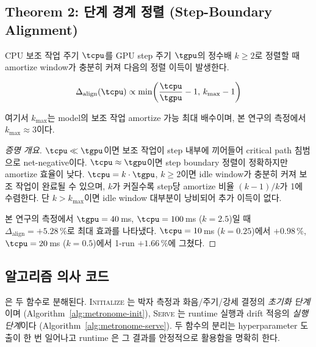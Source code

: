 \subsection{Theorem 2: 단계 경계 정렬 (Step-Boundary Alignment)}
\label{subsec:theorem2}

\begin{theorem}
\label{thm:alignment}
CPU 보조 작업 주기 $\tcpu$를 GPU step 주기 $\tgpu$의 정수배 $k \geq 2$로 정렬할 때 amortize window가 충분히 커져 다음의 정렬 이득이 발생한다.

\begin{equation}
\Delta_{\text{align}}(\tcpu) \propto \min\!\left(\frac{\tcpu}{\tgpu} - 1, \, k_{\max} - 1\right)
\label{eq:alignment}
\end{equation}

여기서 $k_{\max}$는 model의 보조 작업 amortize 가능 최대 배수이며, 본 연구의 측정에서 $k_{\max} \approx 3$이다.
\end{theorem}

\begin{proof}[증명 개요]
$\tcpu \ll \tgpu$이면 보조 작업이 step 내부에 끼어들어 critical path 침범으로 net-negative이다.
$\tcpu \approx \tgpu$이면 step boundary 정렬이 정확하지만 amortize 효율이 낮다.
$\tcpu = k \cdot \tgpu$, $k \geq 2$이면 idle window가 충분히 커져 보조 작업이 완료될 수 있으며, $k$가 커질수록 step당 amortize 비율 $(k-1)/k$가 1에 수렴한다.
단 $k > k_{\max}$이면 idle window 대부분이 낭비되어 추가 이득이 없다.

본 연구의 측정에서 $\tgpu = 40$\,ms, $\tcpu = 100$\,ms ($k=2.5$)일 때 $\Delta_{\text{align}} = +5.28\,\%$로 최대 효과를 나타냈다.
$\tcpu = 10$\,ms ($k = 0.25$)에서 $+0.98\,\%$, $\tcpu = 20$\,ms ($k = 0.5$)에서 1-run $+1.66\,\%$에 그쳤다.
\end{proof}

\subsection{알고리즘 의사 코드}

\algname 은 두 함수로 분해된다.
\textsc{Initialize} 는 박자 측정과 화음/주기/강세 결정의 \emph{초기화 단계}이며 (Algorithm~\ref{alg:metronome-init}), \textsc{Serve} 는 runtime 실행과 drift 적응의 \emph{실행 단계}이다 (Algorithm~\ref{alg:metronome-serve}).
두 함수의 분리는 hyperparameter 도출이 한 번 일어나고 runtime 은 그 결과를 안정적으로 활용함을 명확히 한다.

